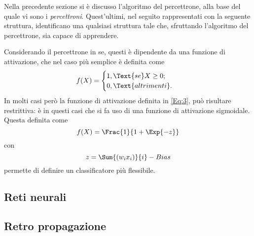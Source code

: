 \documentclass{subfiles}
\begin{document}
Nella precedente sezione si è discusso l'algoritmo del percettrone, alla base del quale vi sono i \emph{percettroni}.
Quest'ultimi, nel seguito rappresentati con la seguente struttura, identificano una qualsiasi struttura tale che,
sfruttando l'algoritmo del percettrone, sia capace di apprendere.

Considerando il percettrone in se, questi è dipendente da una funzione di attivazione, che nel caso più semplice è definita come
\begin{equation}
    f(X) = \begin{cases}
        1, \Text{se} X \ge 0; \\
        0, \Text{altrimenti}.
    \end{cases}
\end{equation}
In molti casi però la funzione di attivazione definita in \eqref{Eq:3}, può risultare restrittiva:
è in questi casi che si fa uso di una funzione di attivazione sigmoidale.
Questa definita come
\[
    f(X) = \Frac{1}{1 + \Exp{-z}}
\]
con
\[
    z = \Sum{\left( w_{i} x_{i} \right)}{i} - Bias
\]
permette di definire un classificatore più flessibile.

\subsection{Reti neurali}


\subsection{Retro propagazione}

\end{document}
